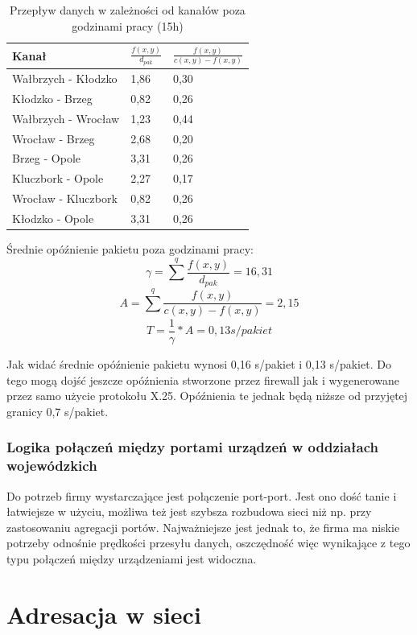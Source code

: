 \documentclass[a4paper]{article}
\begin{document}
\begin{table}[H]
	\centering
	\caption{Przepływ danych w zależności od kanałów poza godzinami pracy (15h)}
	\begin{tabular}{lll}
		\hline
		Kanał & \(\frac{f(x,y)}{d_{pak}}  \) &  \(  \frac{f(x,y)}{c(x,y) - f(x,y)}\) \\
        \hline
Wałbrzych - Kłodzko & 1,86 & 0,30 \\
Kłodzko - Brzeg & 0,82 & 0,26 \\
Wałbrzych - Wrocław & 1,23 & 0,44 \\
Wrocław - Brzeg & 2,68 & 0,20 \\
Brzeg - Opole & 3,31 & 0,26\\
Kluczbork - Opole & 2,27 & 0,17 \\
Wrocław - Kluczbork & 0,82 & 0,26\\
Kłodzko - Opole & 3,31 & 0,26 \\
        \hline
	\end{tabular}	
\end{table}

Średnie opóźnienie pakietu poza godzinami pracy:
$$ \gamma = \sum_{}^{q} \frac{f(x,y)}{d_{pak}} = 16,31 $$
$$ A = \sum_{}^{q} \frac{f(x,y)}{c(x,y) - f(x,y)} = 2,15 $$
$$ T = \frac{1}{\gamma} * A = 0,13 s/pakiet $$
	
Jak widać średnie opóźnienie pakietu wynosi 0,16 s/pakiet i 0,13 s/pakiet. Do tego mogą dojść jeszcze opóźnienia stworzone przez firewall jak i wygenerowane przez samo użycie protokołu X.25. Opóźnienia te jednak będą niższe od przyjętej granicy 0,7 s/pakiet.


\subsubsection{Logika połączeń między portami urządzeń w oddziałach wojewódzkich}

Do potrzeb firmy wystarczające jest połączenie port-port. Jest ono dość tanie i łatwiejsze w użyciu, możliwa też jest szybsza rozbudowa sieci niż np. przy zastosowaniu agregacji portów. Najważniejsze jest jednak to, że firma ma niskie potrzeby odnośnie prędkości przesyłu danych, oszczędność więc wynikające z tego typu połączeń między urządzeniami jest widoczna.


\section{Adresacja w sieci}
\end{document}
